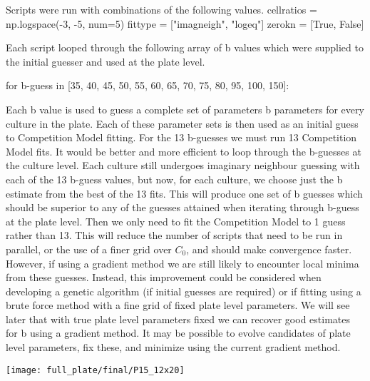 \begin{multicols}{2}

Scripts were run with combinations of the following values.
cellratios = np.logspace(-3, -5, num=5)
fittype = ["imagneigh", "logeq"]
zerokn = [True, False]

Each script looped through the following array of b values which were
supplied to the initial guesser and used at the plate level.

for b-guess in [35, 40, 45, 50, 55, 60, 65, 70, 75, 80, 95, 100, 150]:

Each b value is used to guess a complete set of parameters b
parameters for every culture in the plate. Each of these parameter
sets is then used as an initial guess to Competition Model
fitting. For the 13 b-guesses we must run 13 Competition Model
fits. It would be better and more efficient to loop through the
b-guesses at the culture level. Each culture still undergoes imaginary
neighbour guessing with each of the 13 b-guess values, but now, for
each culture, we choose just the b estimate from the best of the 13
fits. This will produce one set of b guesses which should be superior
to any of the guesses attained when iterating through b-guess at the
plate level. Then we only need to fit the Competition Model to 1 guess
rather than 13. This will reduce the number of scripts that need to be
run in parallel, or the use of a finer grid over \(C_{0}\), and should
make convergence faster. However, if using a gradient method we are
still likely to encounter local minima from these guesses. Instead,
this improvement could be considered when developing a genetic
algorithm (if initial guesses are required) or if fitting using a
brute force method with a fine grid of fixed plate level
parameters. We will see later that with true plate level parameters
fixed we can recover good estimates for b using a gradient method. It
may be possible to evolve candidates of plate level parameters, fix
these, and minimize using the current gradient method.

\end{multicols}
\begin{landscape}
\graphicspath{{images/comp_fit/}}
\begin{Figure}
  \centering
  \texttt{[image: full\_plate/final/P15\_12x20]}
  \label{fig:comp_fit_plate}
\end{Figure}
\end{landscape}
\begin{multicols}{2}

\end{multicols}
